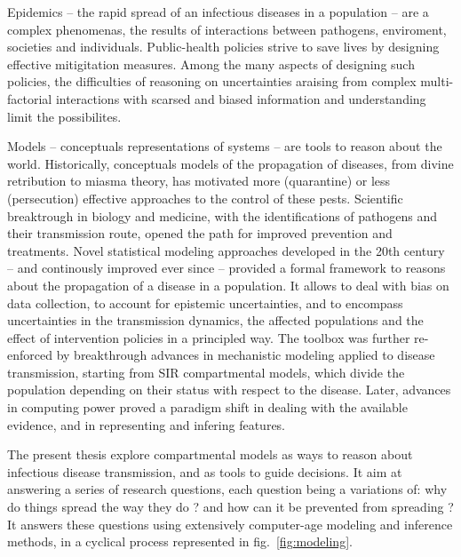 Epidemics -- the rapid spread of an infectious diseases in a population -- are a complex phenomenas, the results of interactions between pathogens, enviroment, societies and individuals\cite{Rinaldo:RiverNetworksEcological:2020a, Buckee:ThinkingClearlySocial:2021, Heesterbeek:ModelingInfectiousDisease:2015}. Public-health policies strive to save lives by designing effective mitigitation measures. Among the many aspects of designing such policies, the difficulties of reasoning on uncertainties araising from complex multi-factorial interactions with scarsed and biased information and understanding limit the possibilites. 

Models -- conceptuals representations of systems -- are tools to reason about the world. Historically, conceptuals models of the propagation of diseases, from divine retribution to miasma theory, has motivated more (quarantine) or less (persecution) effective approaches to the control of these pests. Scientific breaktrough in biology and medicine, with the identifications of pathogens and their transmission route, opened the path for improved prevention and treatments. Novel statistical modeling approaches\cite[-3\baselineskip]{Freedman:AssociationCausationRemarks:1999} developed in the 20th century -- and continously improved ever since\cite{Gelman:WhatAreMost:2021} --  provided a formal framework to reasons about the propagation of a disease in a population. It allows to deal with bias on data collection, to account for epistemic uncertainties, and to encompass uncertainties in the transmission dynamics, the affected populations and the effect of intervention policies in a principled way. The toolbox was further re-enforced by breakthrough advances in mechanistic modeling applied to disease transmission, starting from SIR compartmental models\cite{Kermack:ContributionMathematicalTheory:1927, Anderson:PopulationBiologyInfectious:1979}, which divide the population depending on their status with respect to the disease. Later, advances in computing power proved a paradigm shift in dealing with the available evidence, and in representing and infering features. 

The present thesis explore compartmental models as ways to reason about infectious disease transmission, and as tools to guide decisions. It aim at answering a series of research questions, each question being a variations of: why do things spread the way they do ? and how can it be prevented from spreading ? It answers these questions using extensively computer-age modeling and inference methods, in a cyclical process represented in fig.~\ref{fig:modeling}. %

